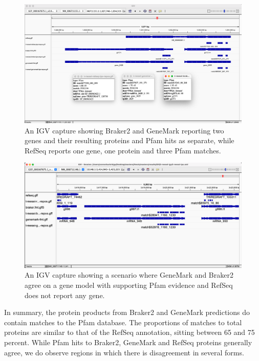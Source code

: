 \begin{figure}[h!]
  \centering
  \includegraphics[width=\textwidth]{figures/igv/ips-model-disagree2.png}
  \caption[Split Pfam matches]{An IGV capture showing Braker2 and
    GeneMark reporting two genes and their resulting proteins and
    Pfam hits as separate, while RefSeq reports one gene, one protein
    and three Pfam matches.}
  \label{fig:agree-bizarre2}
\end{figure}

\begin{figure}
  \centering
  \includegraphics[width=\textwidth]{figures/igv/ips-braker-genemark-norefseq.png}
  \caption[RefSeq absence with IPS evidence]{An IGV capture showing a
    scenario where GeneMark and Braker2 agree on a gene model with
    supporting Pfam evidence and RefSeq does not report any gene.}
  \label{fig:ips-no-refseq}
\end{figure}

In summary, the protein products from Braker2 and GeneMark predictions
do contain matches to the Pfam database. The proportions of matches to
total proteins are similar to that of the RefSeq annotation, sitting
between 65 and 75 percent. While Pfam hits to Braker2, GeneMark and
RefSeq proteins generally agree, we do observe regions in which there
is disagreement in several forms.
